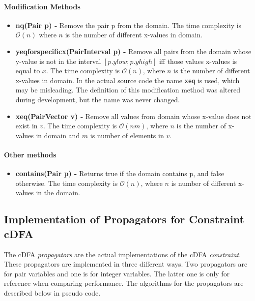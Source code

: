 \documentclass[a4paper,11pt]{article}
\begin{document}
\paragraph{Modification Methods}
\begin{itemize}
\item {\textbf{nq(Pair p) - }} Remove the pair p from the domain. The time complexity is $\mathcal{O}(n)$ where $n$ is the number of different x-values in domain.

\item{\textbf{yeqforspecificx(PairInterval p) - }} Remove all pairs from the domain whose y-value is not in the interval $[p.ylow; p.yhigh]$ iff those values x-values is equal to $x$. The time complexity is $\mathcal{O}(n)$, where $n$ is the number of different x-values in domain. In the actual source code the name \texttt{xeq} is used, which may be misleading. The definition of this modification method was altered during development, but the name was never changed.

\item{\textbf{xeq(PairVector v) - }} Remove all values from domain whose x-value does not exist in $v$. The time complexity is $\mathcal{O}(nm)$, where $n$ is the number of x-values in domain and $m$ is number of elements in $v$.
\end{itemize}

\paragraph{Other methods}
\begin{itemize}
\item {\textbf{contains(Pair p) - }} Returns true if the domain contains p, and false otherwise. The time complexity is $\mathcal{O}(n)$, where $n$ is number of different x-values in the domain.
\end{itemize}

\subsection{Implementation of Propagators for Constraint cDFA}
\label{sec:propimp}
The cDFA \textit{propagators} are the actual implementations of the cDFA \textit{constraint}. These propagators are implemented in three different ways. Two propagators are for pair variables and one is for integer variables. The latter one is only for reference when comparing performance. The algorithms for the propagators are described below in pseudo code.
\end{document}
